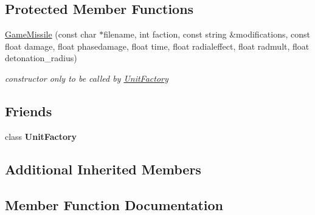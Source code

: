\subsection*{Protected Member Functions}
\begin{DoxyCompactItemize}
\item 
\hyperlink{classGameMissile_ab7b57c7286bccdc26152a2d8ccf2c6be}{Game\+Missile} (const char $\ast$filename, int faction, const string \&modifications, const float damage, float phasedamage, float time, float radialeffect, float radmult, float detonation\+\_\+radius)\hypertarget{classGameMissile_ab7b57c7286bccdc26152a2d8ccf2c6be}{}\label{classGameMissile_ab7b57c7286bccdc26152a2d8ccf2c6be}

\begin{DoxyCompactList}\small\item\em constructor only to be called by \hyperlink{classUnitFactory}{Unit\+Factory} \end{DoxyCompactList}\end{DoxyCompactItemize}
\subsection*{Friends}
\begin{DoxyCompactItemize}
\item 
class {\bfseries Unit\+Factory}\hypertarget{classGameMissile_a187c66d2d867f6265d3b0c99ffc34838}{}\label{classGameMissile_a187c66d2d867f6265d3b0c99ffc34838}

\end{DoxyCompactItemize}
\subsection*{Additional Inherited Members}


\subsection{Member Function Documentation}

